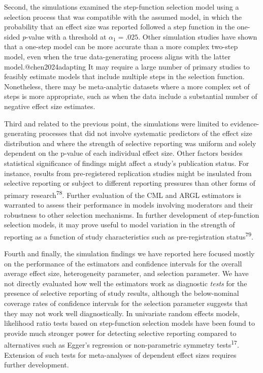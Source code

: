 \documentclass[
  man, donotrepeattitle,floatsintext]{apa7}
\begin{document}
Second, the simulations examined the step-function selection model using a selection process that was compatible with the assumed model, in which the probability that an effect size was reported followed a step function in the one-sided \emph{p}-value with a threshold at \(\alpha_1 = .025\).
Other simulation studies have shown that a one-step model can be more accurate than a more complex two-step model, even when the true data-generating process aligns with the latter model.@chen2024adapting
It may require a large number of primary studies to feasibly estimate models that include multiple steps in the selection function.
Nonetheless, there may be meta-analytic datasets where a more complex set of steps is more appropriate, such as when the data include a substantial number of negative effect size estimates.

Third and related to the previous point, the simulations were limited to evidence-generating processes that did not involve systematic predictors of the effect size distribution and where the strength of selective reporting was uniform and solely dependent on the p-value of each individual effect size.
Other factors besides statistical significance of findings might affect a study's publication status.
For instance, results from pre-registered replication studies might be insulated from selective reporting or subject to different reporting pressures than other forms of primary research\textsuperscript{78}.
Further evaluation of the CML and ARGL estimators is warranted to assess their performance in models involving moderators and their robustness to other selection mechanisms.
In further development of step-function selection models, it may prove useful to model variation in the strength of reporting as a function of study characteristics such as pre-registration status\textsuperscript{79}.

Fourth and finally, the simulation findings we have reported here focused mostly on the performance of the estimators and confidence intervals for the overall average effect size, heterogeneity parameter, and selection parameter.
We have not directly evaluated how well the estimators work as diagnostic \emph{tests} for the presence of selective reporting of study results, although the below-nominal coverage rates of confidence intervals for the selection parameter suggests that they may not work well diagnostically.
In univariate random effects models, likelihood ratio tests based on step-function selection models have been found to provide much stronger power for detecting selective reporting compared to alternatives such as Egger's regression or non-parametric symmetry tests\textsuperscript{17}.
Extension of such tests for meta-analyses of dependent effect sizes requires further development.
\end{document}
